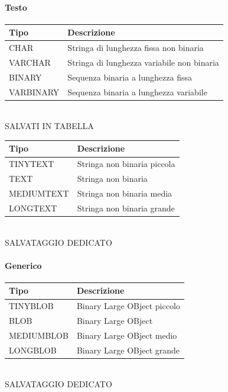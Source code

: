 \documentclass[12pt,a4paper]{article}
\begin{document}
\paragraph{Testo\\}
\begin{center}
\begin{tabular}{ll}
\textbf{Tipo} & \textbf{Descrizione}\\ \hline
CHAR & Stringa di lunghezza fissa non binaria\\ \hline
VARCHAR & Stringa di lunghezza variabile non binaria\\ \hline
BINARY & Sequenza binaria a lunghezza fissa\\ \hline
VARBINARY & Sequenza binaria a lunghezza variabile\\ 
\end{tabular}\\ \SmallSep
SALVATI IN TABELLA\\ \Sep
\begin{tabular}{ll}
\textbf{Tipo} & \textbf{Descrizione}\\ \hline
TINYTEXT & Stringa non binaria piccola\\ \hline
TEXT & Stringa non binaria\\ \hline
MEDIUMTEXT & Stringa non binaria media\\ \hline
LONGTEXT & Stringa non binaria grande\\ 
\end{tabular}\\ \SmallSep
SALVATAGGIO DEDICATO\end{center}


\paragraph{Generico\\}
\begin{center}
\begin{tabular}{ll}
\textbf{Tipo} & \textbf{Descrizione}\\ \hline
TINYBLOB & Binary Large OBject piccolo\\ \hline
BLOB & Binary Large OBject\\ \hline
MEDIUMBLOB & Binary Large OBject medio\\ \hline
LONGBLOB & Binary Large OBject grande\\ 
\end{tabular}\\ \SmallSep SALVATAGGIO DEDICATO\end{center}
\end{document}
